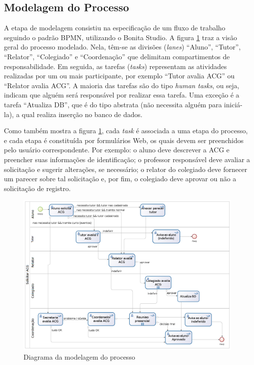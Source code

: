 \documentclass[12pt]{article}
\begin{document}
\subsection{Modelagem do Processo}

A etapa de modelagem consistiu na especificação de um fluxo de trabalho seguindo o padrão BPMN, utilizando o Bonita Studio. A figura \ref{fig:diagrama} traz a visão geral do processo modelado. Nela, têm-se as divisões (\emph{lanes}) “Aluno”, “Tutor”, “Relator”, “Colegiado” e “Coordenação” que delimitam compartimentos de responsabilidade. Em seguida, as tarefas  (\emph{tasks})  representam as atividades realizadas por um ou mais participante, por exemplo “Tutor avalia ACG” ou “Relator avalia ACG”. A maioria das tarefas são do tipo \emph{human tasks}, ou seja, indicam que alguém será responsável por realizar essa tarefa. Uma exceção é a tarefa “Atualiza DB”, que é do tipo abstrata (não necessita alguém para iniciá-la), a qual realiza inserção no banco de dados.

Como também mostra a figura \ref{fig:diagrama}, cada \emph{task}  é associada a uma etapa do processo, e cada etapa é constituída  por formulários Web, os quais devem ser preenchidos pelo usuário correspondente. Por exemplo: o aluno deve  descrever  a ACG e preencher  suas  informações  de  identificação;  o professor responsável deve avaliar a solicitação e sugerir alterações, se necessário; o relator do colegiado deve fornecer um parecer sobre tal solicitação e, por fim, o colegiado deve aprovar ou não a solicitação de registro.

\begin{figure}[ht]
\centering
\includegraphics[width=.99\textwidth]{images/processo.png}
\caption{Diagrama da modelagem do processo}
\label{fig:diagrama}
\end{figure}
\end{document}
